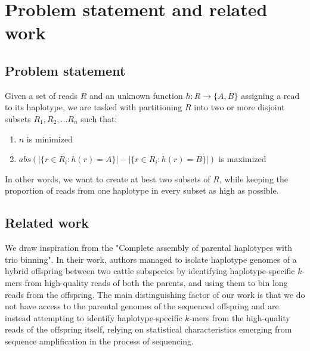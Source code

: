 \chapter{Problem statement and related work}

\section{Problem statement}

Given a set of reads $R$ and an unknown function $h : R \rightarrow \{A, B\}$ assigning a read to its haplotype, we are tasked with partitioning $R$ into two or more disjoint subsets $R_1, R_2, ... R_n$ such that:
\begin{enumerate}
	\item{$n$ is minimized}
	\item{$abs(|\{ r \in R_i : h(r) = A \}| - |\{ r \in R_i : h(r) = B \}|)$ is maximized}
\end{enumerate}

In other words, we want to create at best two subsets of $R$, while keeping the proportion of reads from one haplotype in every subset as high as possible.

\section{Related work}

We draw inspiration from the "Complete assembly of parental haplotypes with trio binning"\cite{koren2018complete}. In their work, authors managed to isolate haplotype genomes of a hybrid offspring between two cattle subspecies by identifying haplotype-specific $k$-mers from high-quality reads of both the parents, and using them to bin long reads from the offspring.
The main distinguishing factor of our work is that we do not have access to the parental genomes of the sequenced offspring and are instead attempting to identify haplotype-specific $k$-mers from the high-quality reads of the offspring itself, relying on statistical characteristics emerging from sequence amplification in the process of sequencing.
